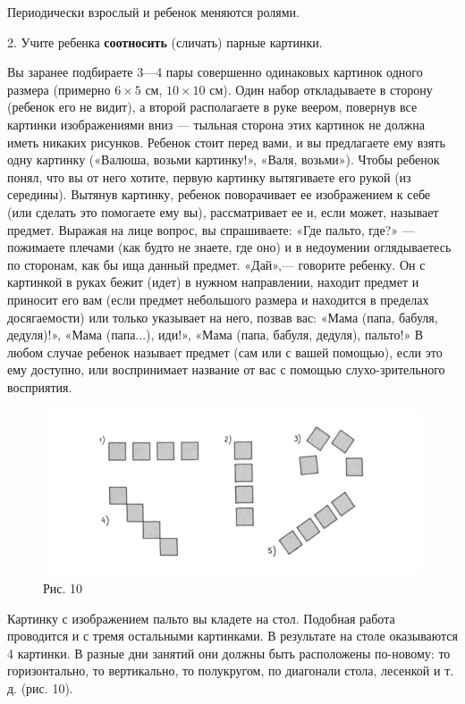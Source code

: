\documentclass[a5paper]{book}
\begin{document}
Периодически взрослый и ребенок меняются ролями.

2. Учите ребенка \textbf{соотносить} (сличать) парные картинки.

Вы заранее подбираете 3---4 пары совершенно одинаковых картинок одного
размера (примерно $6 \times 5$ см, $10 \times 10$ см). Один набор откладываете в сторону
(ребенок его не видит), а второй располагаете в руке веером, повернув
все картинки изображениями вниз --- тыльная сторона этих картинок не
должна иметь никаких рисунков. Ребенок стоит перед вами, и вы
предлагаете ему взять одну картинку («Валюша, возьми картинку!», «Валя,
возьми»). Чтобы ребенок понял, что вы от него хотите, первую картинку
вытягиваете его рукой (из середины). Вытянув картинку, ребенок
поворачивает ее изображением к себе (или сделать это помогаете ему вы),
рассматривает ее и, если может, называет предмет. Выражая на лице
вопрос, вы спрашиваете: «Где пальто, где?» --- пожимаете плечами (как
будто не знаете, где оно) и в недоумении оглядываетесь по сторонам, как
бы ища данный предмет. «Дай»,--- говорите ребенку. Он с картинкой в
руках бежит (идет) в нужном направлении, находит предмет и приносит его
вам (если предмет небольшого размера и находится в пределах
досягаемости) или только указывает на него, позвав вас: «Мама (папа,
бабуля, дедуля)!», «Мама (папа...), иди!», «Мама (папа, бабуля, дедуля),
пальто!» В любом случае ребенок называет предмет (сам или с вашей
помощью), если это ему доступно, или воспринимает название от вас с
помощью слухо-зрительного восприятия.

\begin{figure}
\centering
\includegraphics[width=\linewidth]{media/media/image10.png}
\caption*{Рис. 10}
\end{figure}

Картинку с изображением пальто вы кладете на стол. Подобная работа
проводится и с тремя остальными картинками. В результате на столе
оказываются 4 картинки. В разные дни занятий они должны быть расположены
по-новому: то горизонтально, то вертикально, то полукругом, по диагонали
стола, лесенкой и т. д. (рис. 10).
\end{document}
